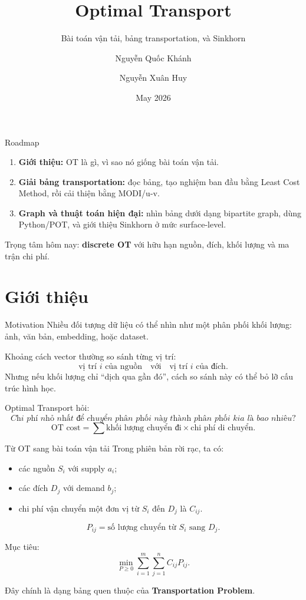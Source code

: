 \documentclass[10pt]{beamer}
\title[Optimal Transport]{Optimal Transport}
\subtitle{Bài toán vận tải, bảng transportation, và Sinkhorn}
\author[Khánh \and Huy]{Nguyễn Quốc Khánh \and Nguyễn Xuân Huy}
\institute[UIT]{University of Information Technology -- VNU-HCM}
\date{May 2026}
\begin{document}
\begin{frame}
    \titlepage
\end{frame}

\begin{frame}{Roadmap}
    \begin{enumerate}
        \item \textbf{Giới thiệu:} OT là gì, vì sao nó giống bài toán vận tải.
        \item \textbf{Giải bảng transportation:} đọc bảng, tạo nghiệm ban đầu bằng Least Cost Method, rồi cải thiện bằng MODI/u-v.
        \item \textbf{Graph và thuật toán hiện đại:} nhìn bảng dưới dạng bipartite graph, dùng Python/POT, và giới thiệu Sinkhorn ở mức surface-level.
    \end{enumerate}
    \vspace{0.2cm}
    \centering
    Trọng tâm hôm nay: \textbf{discrete OT} với hữu hạn nguồn, đích, khối lượng và ma trận chi phí.
\end{frame}

\section{Giới thiệu}

\begin{frame}{Motivation}
    Nhiều đối tượng dữ liệu có thể nhìn như một phân phối khối lượng:
    ảnh, văn bản, embedding, hoặc dataset.

    \vspace{0.2cm}
    Khoảng cách vector thường so sánh từng vị trí:
    \[
        \text{vị trí }i\text{ của nguồn} \quad \text{với} \quad \text{vị trí }i\text{ của đích}.
    \]
    Nhưng nếu khối lượng chỉ ``dịch qua gần đó'', cách so sánh này có thể bỏ lỡ cấu trúc hình học.

    \vspace{0.2cm}
    Optimal Transport hỏi:
    \[
        \textit{Chi phí nhỏ nhất để chuyển phân phối này thành phân phối kia là bao nhiêu?}
    \]
    \[
        \text{OT cost}=\sum \text{khối lượng chuyển đi}\times \text{chi phí di chuyển}.
    \]
\end{frame}

\begin{frame}{Từ OT sang bài toán vận tải}
    Trong phiên bản rời rạc, ta có:
    \begin{itemize}
        \item các nguồn $S_i$ với supply $a_i$;
        \item các đích $D_j$ với demand $b_j$;
        \item chi phí vận chuyển một đơn vị từ $S_i$ đến $D_j$ là $C_{ij}$.
    \end{itemize}

    \[
        P_{ij}=\text{số lượng chuyển từ }S_i\text{ sang }D_j.
    \]

    Mục tiêu:
    \[
        \min_{P\ge 0}\sum_{i=1}^{m}\sum_{j=1}^{n} C_{ij}P_{ij}.
    \]

    Đây chính là dạng bảng quen thuộc của \textbf{Transportation Problem}.
\end{frame}
\end{document}
